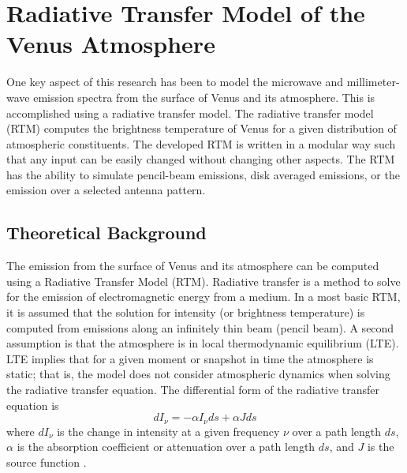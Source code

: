 \chapter[Radiative Transfer Model of the \\Venus Atmosphere]{Radiative Transfer Model of the Venus Atmosphere}


One key aspect of this research has been to model the microwave and millimeter-wave emission spectra from the surface of Venus and its atmosphere. This is accomplished using a radiative transfer model. The radiative transfer model (RTM) computes the brightness temperature of Venus for a given distribution of atmospheric constituents. The developed RTM is written in a modular way such that any input can be easily changed without changing other aspects. The RTM has the ability to simulate pencil-beam emissions, disk averaged emissions, or the emission over a selected antenna pattern. %

\section{Theoretical Background}

The emission from the surface of Venus and its atmosphere can be computed using a Radiative Transfer Model (RTM). Radiative transfer is a method to solve for the emission of electromagnetic energy from a medium. In a most basic RTM, it is assumed that the solution for intensity (or brightness temperature) is computed from emissions along an infinitely thin beam (pencil beam). A second assumption is that the atmosphere is in local thermodynamic equilibrium (LTE). LTE implies that for a given moment or snapshot in time the atmosphere is static; that is, the model does not consider atmospheric dynamics when solving the radiative transfer equation. The differential form of the radiative transfer equation is
\begin{equation}\label{eq:rtm-diff}
dI_{\nu}= -\alpha I_{\nu }ds + \alpha J ds
\end{equation}
where $dI_\nu$ is the change in intensity at a given frequency $\nu$ over a path length $ds$, $\alpha$ is the absorption coefficient or attenuation over a path length $ds$, and $J$ is the source function \cite{Liou-2002}. 

